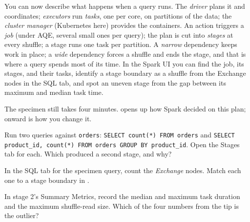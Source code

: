 You can now describe what happens when a query runs. The \emph{driver} plans it
and coordinates; \emph{executors} run \emph{tasks}, one per core, on partitions of
the data; the \emph{cluster manager} (Kubernetes here) provides the containers.
An action triggers a \emph{job} (under AQE, several small ones per query); the
plan is cut into \emph{stages} at every shuffle; a stage runs one task per partition. A \emph{narrow} dependency keeps
work in place; a \emph{wide} dependency forces a shuffle and ends the stage, and
that is where a query spends most of its time. In the Spark UI you can find the
job, its stages, and their tasks, identify a stage boundary as a shuffle from the
Exchange nodes in the SQL tab, and spot an uneven stage from the gap between its
maximum and median task time.

The specimen still takes four minutes.  opens up how Spark
decided on this plan;  onward is how you change it.

\exercisehead
\begin{exercises}
\item Run two queries against \texttt{orders}: \texttt{SELECT count(*) FROM orders}
      and \texttt{SELECT product\_id, count(*) FROM orders GROUP BY product\_id}.
      Open the Stages tab for each. Which produced a second stage, and why?
\item In the SQL tab for the specimen query, count the \emph{Exchange} nodes.
      Match each one to a stage boundary in .
\item In stage 2's Summary Metrics, record the median and maximum task duration
      and the maximum shuffle-read size. Which of the four numbers from the tip
      is the outlier?
\end{exercises}
